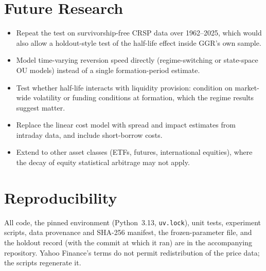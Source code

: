 \documentclass[11pt]{article}
\begin{document}
\section{Future Research}

\begin{itemize}
\item Repeat the test on survivorship-free CRSP data over 1962--2025, which would also allow a holdout-style test of the half-life effect inside GGR's own sample.
\item Model time-varying reversion speed directly (regime-switching or state-space OU models) instead of a single formation-period estimate.
\item Test whether half-life interacts with liquidity provision: condition on market-wide volatility or funding conditions at formation, which the regime results suggest matter.
\item Replace the linear cost model with spread and impact estimates from intraday data, and include short-borrow costs.
\item Extend to other asset classes (ETFs, futures, international equities), where the decay of equity statistical arbitrage may not apply.
\end{itemize}

\section*{Reproducibility}
All code, the pinned environment (Python~3.13, \texttt{uv.lock}), unit tests, experiment scripts, data provenance and SHA-256 manifest, the frozen-parameter file, and the holdout record (with the commit at which it ran) are in the accompanying repository. Yahoo Finance's terms do not permit redistribution of the price data; the scripts regenerate it.



\end{document}
